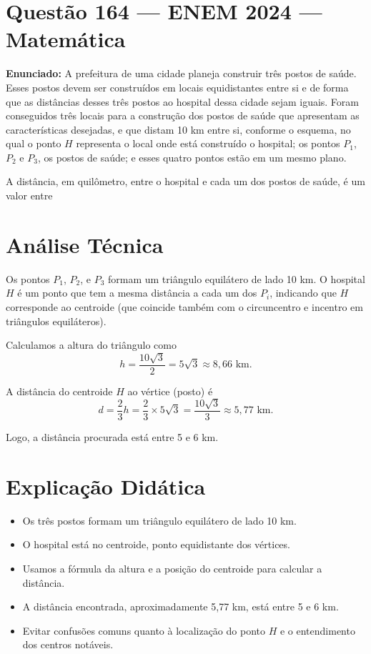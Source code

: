 \documentclass{article}
\begin{document}
\section*{Questão 164 — ENEM 2024 — Matemática}

\textbf{Enunciado:}
A prefeitura de uma cidade planeja construir três postos de saúde. Esses postos devem ser construídos em locais equidistantes entre si e de forma que as distâncias desses três postos ao hospital dessa cidade sejam iguais. Foram conseguidos três locais para a construção dos postos de saúde que apresentam as características desejadas, e que distam 10 km entre si, conforme o esquema, no qual o ponto $H$ representa o local onde está construído o hospital; os pontos $P_1$, $P_2$ e $P_3$, os postos de saúde; e esses quatro pontos estão em um mesmo plano.

A distância, em quilômetro, entre o hospital e cada um dos postos de saúde, é um valor entre

\section*{Análise Técnica}

Os pontos $P_1$, $P_2$, e $P_3$ formam um triângulo equilátero de lado 10 km. O hospital $H$ é um ponto que tem a mesma distância a cada um dos $P_i$, indicando que $H$ corresponde ao centroide (que coincide também com o circuncentro e incentro em triângulos equiláteros).

Calculamos a altura do triângulo como
\[
h = \frac{10 \sqrt{3}}{2} = 5 \sqrt{3} \approx 8{,}66 \text{ km}.
\]

A distância do centroide $H$ ao vértice (posto) é
\[
d = \frac{2}{3}h = \frac{2}{3} \times 5 \sqrt{3} = \frac{10 \sqrt{3}}{3} \approx 5{,}77 \text{ km}.
\]

Logo, a distância procurada está entre 5 e 6 km.

\section*{Explicação Didática}

\begin{itemize}
  \item Os três postos formam um triângulo equilátero de lado 10 km.
  \item O hospital está no centroide, ponto equidistante dos vértices.
  \item Usamos a fórmula da altura e a posição do centroide para calcular a distância.
  \item A distância encontrada, aproximadamente 5,77 km, está entre 5 e 6 km.
  \item Evitar confusões comuns quanto à localização do ponto $H$ e o entendimento dos centros notáveis.
\end{itemize}
\end{document}
